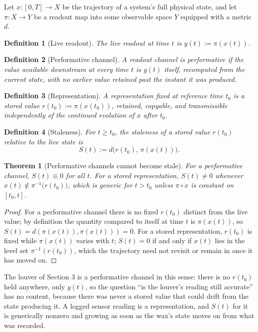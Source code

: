 \documentclass[11pt]{article}
\newtheorem{theorem}{Theorem}
\newtheorem{definition}{Definition}
\begin{document}
Let $x:[0,T]\to X$ be the trajectory of a system's full physical state, and let $\pi: X \to Y$ be a readout map into some observable space $Y$ equipped with a metric $d$.

\begin{definition}[Live readout]
The live readout at time $t$ is $y(t) := \pi(x(t))$.
\end{definition}

\begin{definition}[Performative channel]
A readout channel is performative if the value available downstream at every time $t$ is $y(t)$ itself, recomputed from the current state, with no earlier value retained past the instant it was produced.
\end{definition}

\begin{definition}[Representation]
A representation fixed at reference time $t_0$ is a stored value $r(t_0) := \pi(x(t_0))$, retained, copyable, and transmissible independently of the continued evolution of $x$ after $t_0$.
\end{definition}

\begin{definition}[Staleness]
For $t \ge t_0$, the staleness of a stored value $r(t_0)$ relative to the live state is
\[
S(t) := d\big(r(t_0),\, \pi(x(t))\big).
\]
\end{definition}

\begin{theorem}[Performative channels cannot become stale]
For a performative channel, $S(t) \equiv 0$ for all $t$. For a stored representation, $S(t) \ne 0$ whenever $x(t) \notin \pi^{-1}\big(r(t_0)\big)$, which is generic for $t > t_0$ unless $\pi \circ x$ is constant on $[t_0,t]$.
\end{theorem}

\begin{proof}
For a performative channel there is no fixed $r(t_0)$ distinct from the live value; by definition the quantity compared to itself at time $t$ is $\pi(x(t))$, so $S(t) = d(\pi(x(t)),\pi(x(t))) = 0$. For a stored representation, $r(t_0)$ is fixed while $\pi(x(t))$ varies with $t$; $S(t) = 0$ if and only if $x(t)$ lies in the level set $\pi^{-1}(r(t_0))$, which the trajectory need not revisit or remain in once it has moved on.
\end{proof}

The louver of Section 3 is a performative channel in this sense: there is no $r(t_0)$ held anywhere, only $y(t)$, so the question ``is the louver's reading still accurate'' has no content, because there was never a stored value that could drift from the state producing it. A logged sensor reading is a representation, and $S(t)$ for it is generically nonzero and growing as soon as the wax's state moves on from what was recorded.
\end{document}
